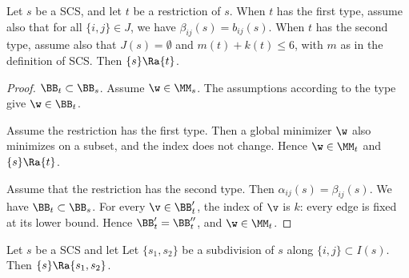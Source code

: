 

\begin{lemma}[restriction]
Let $s$ be a SCS, and let $t$ be a restriction of $s$.
When $t$ has the first type, assume also that for all $\{ i , j\} \in J$, we have $\beta_{i j}(s) = b_{i j}(s)$.
When $t$ has the second type, assume also that $J(s)=\emptyset$ and $m(t)+k(t)\le 6$, with $m$ as in
the definition of SCS.
Then $\{s\}\Ra \{t\}$.
\end{lemma}

\begin{proof}
$\BB_t\subset \BB_s$. Assume
 $\w\in \MM_s$. The assumptions  according to the type give $\w\in \BB_t$.

Assume the restriction has the first type.  Then a global minimizer $\w$ also
minimizes on a subset,  and the index does not change.  Hence $\w\in \MM_t$ and $\{s\}\Ra\{t\}$.

Assume that the restriction has the second type. Then 
 $\alpha_{ij}(s)=\beta_{ij}(s)$.    We have $\BB_t\subset \BB_s$.
For every $\v\in \BB'_t$, the index of $\v$ is $k$: every edge is fixed at its lower bound.
Hence $\BB'_t = \BB''_t$, and $\w\in \MM_t$.
\end{proof}


\begin{lemma}[subdivision]
Let $s$ be a SCS and let
Let $\{s_1,s_2\}$ be a subdivision of $s$ along $\{i,j\}\subset I(s)$.
Then $\{s\}\Ra\{s_1,s_2\}$.
\end{lemma}

